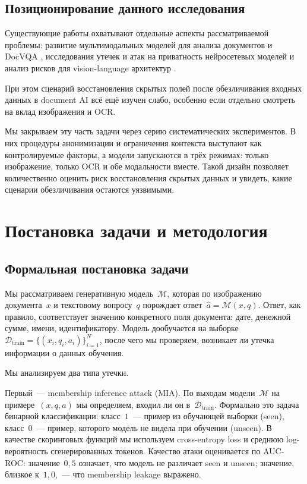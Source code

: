 \documentclass[a4paper,12pt]{extarticle}
\begin{document}
\subsection{Позиционирование данного исследования}

Существующие работы охватывают отдельные аспекты рассматриваемой проблемы: развитие мультимодальных моделей для анализа документов и DocVQA \cite{layoutlmv3,donut,docvqa}, исследования утечек и атак на приватность нейросетевых моделей \cite{carlini_extraction,tde_survey_2023,zhang_mi_cvpr20} и анализ рисков для vision-language архитектур \cite{vlm_mia_neurips24}. 

При этом сценарий восстановления скрытых полей после обезличивания входных данных в document AI всё ещё изучен слабо, особенно если отдельно смотреть на вклад изображения и OCR.

Мы закрываем эту часть задачи через серию систематических экспериментов. В них процедуры анонимизации и ограничения контекста выступают как контролируемые факторы, а модели запускаются в трёх режимах: только изображение, только OCR и обе модальности вместе. Такой дизайн позволяет количественно оценить риск восстановления скрытых данных и увидеть, какие сценарии обезличивания остаются уязвимыми.



\section{Постановка задачи и методология}
\label{sec:methodology}

\subsection{Формальная постановка задачи}
\label{sec:problem_statement}

Мы рассматриваем генеративную модель~$\mathcal{M}$, которая по изображению документа~$x$ и текстовому вопросу~$q$ порождает ответ~$\hat{a} = \mathcal{M}(x, q)$. Ответ, как правило, соответствует значению конкретного поля документа: дате, денежной сумме, имени, идентификатору. Модель дообучается на выборке~$\mathcal{D}_{\mathrm{train}} = \{(x_i, q_i, a_i)\}_{i=1}^{N}$, после чего мы проверяем, возникает ли утечка информации о данных обучения.

Мы анализируем два типа утечки.

Первый~--- membership inference attack (MIA). По выходам модели~$\mathcal{M}$ на примере~$(x, q, a)$ мы определяем, входил ли он в~$\mathcal{D}_{\mathrm{train}}$. Формально это задача бинарной классификации: класс~$1$~--- пример из обучающей выборки (seen), класс~$0$~--- пример, которого модель не видела при обучении (unseen). В качестве скоринговых функций мы используем cross-entropy loss и среднюю log-вероятность сгенерированных токенов. Качество атаки оценивается по AUC-ROC: значение~$0{,}5$ означает, что модель не различает seen и unseen; значение, близкое к~$1{,}0$,~--- что membership leakage выражено.
\end{document}
